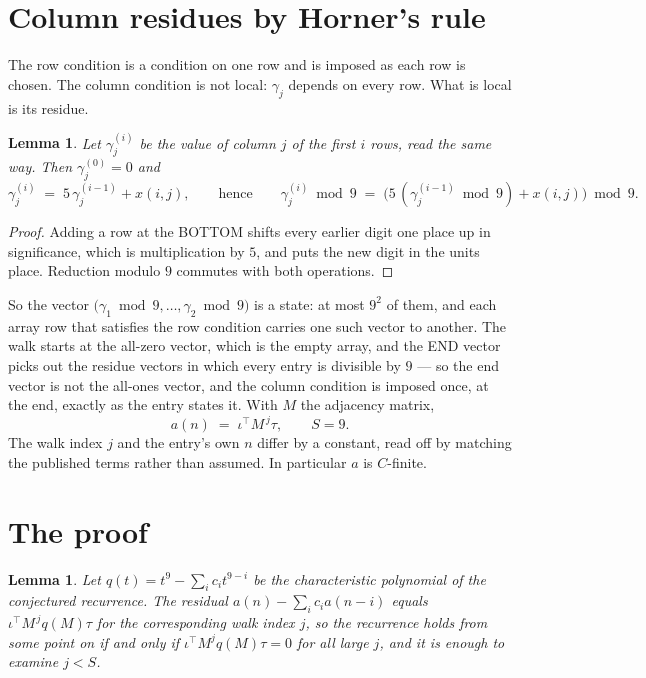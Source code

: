 \documentclass[11pt,a4paper]{article}
\theoremstyle{plain}
\newtheorem{lemma}[theorem]{Lemma}
\theoremstyle{definition}
\begin{document}
\section{Column residues by Horner's rule}

The row condition is a condition on one row and is imposed as each row is chosen. The column
condition is not local: $\gamma_j$ depends on every row. What is local is its residue.

\begin{lemma}\label{lem:horner}
Let $\gamma_j^{(i)}$ be the value of column $j$ of the first $i$ rows, read the same way.
Then $\gamma_j^{(0)}=0$ and
\[
\gamma_j^{(i)}\;=\;5\,\gamma_j^{(i-1)}+x(i,j),
\qquad\text{hence}\qquad
\gamma_j^{(i)}\bmod 9\;=\;
\bigl(5\,(\gamma_j^{(i-1)}\bmod 9)+x(i,j)\bigr)\bmod 9 .
\]
\end{lemma}

\begin{proof}
Adding a row at the BOTTOM shifts every earlier digit one place up in significance, which is
multiplication by $5$, and puts the new digit in the units place. Reduction modulo
$9$ commutes with both operations.
\end{proof}

So the vector $\bigl(\gamma_1\bmod 9,\dots,\gamma_{2}\bmod
9\bigr)$ is a state: at most $9^{2}$ of them, and each array row
that satisfies the row condition carries one such vector to another. The walk starts at the
all-zero vector, which is the empty array, and the END vector picks out the residue vectors in
which every entry is divisible by $9$ --- so the end vector is not the all-ones
vector, and the column condition is imposed once, at the end, exactly as the entry states it.
With $M$ the adjacency matrix,
\[
a(n)\;=\;\iota^{\!\top}M^{\,j}\tau ,\qquad S=9.
\]
The walk index $j$ and the entry's own $n$ differ by a constant, read off by matching the
published terms rather than assumed. In particular $a$ is $C$-finite.

\section{The proof}

\begin{lemma}\label{lem:crit}
Let $q(t)=t^{9}-\sum_i c_it^{9-i}$ be the characteristic polynomial of the
conjectured recurrence. The residual $a(n)-\sum_ic_ia(n-i)$ equals
$\iota^{\!\top}M^{\,j}q(M)\tau$ for the corresponding walk index $j$, so the recurrence
holds from some point on if and only if $\iota^{\!\top}M^{j}q(M)\tau=0$ for all large $j$,
and it is enough to examine $j<S$.
\end{lemma}
\end{document}
